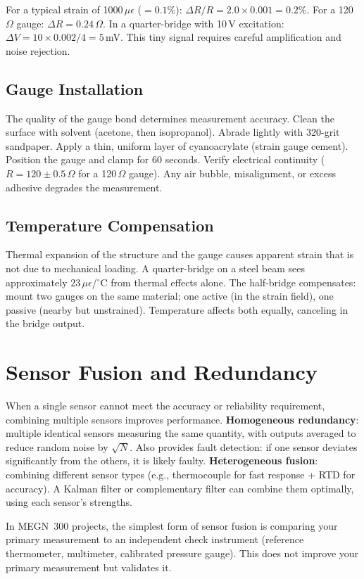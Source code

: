 \documentclass[11pt,letterpaper,twoside,openany]{book}
\newcommand{\degC}{\ensuremath{{}^{\circ}\text{C}}}
\begin{document}
For a typical strain of 1000\,$\mu\epsilon$ ($= 0.1\%$): $\Delta R/R = 2.0 \times 0.001 = 0.2\%$. For a 120\,$\Omega$ gauge: $\Delta R = 0.24\,\Omega$. In a quarter-bridge with 10\,V excitation: $\Delta V = 10 \times 0.002/4 = 5$\,mV. This tiny signal requires careful amplification and noise rejection.

\subsection{Gauge Installation}
The quality of the gauge bond determines measurement accuracy. Clean the surface with solvent (acetone, then isopropanol). Abrade lightly with 320-grit sandpaper. Apply a thin, uniform layer of cyanoacrylate (strain gauge cement). Position the gauge and clamp for 60 seconds. Verify electrical continuity ($R = 120 \pm 0.5\,\Omega$ for a 120\,$\Omega$ gauge). Any air bubble, misalignment, or excess adhesive degrades the measurement.

\subsection{Temperature Compensation}
Thermal expansion of the structure and the gauge causes apparent strain that is not due to mechanical loading. A quarter-bridge on a steel beam sees approximately $23\,\mu\epsilon$/\degC{} from thermal effects alone. The half-bridge compensates: mount two gauges on the same material; one active (in the strain field), one passive (nearby but unstrained). Temperature affects both equally, canceling in the bridge output.
\section{Sensor Fusion and Redundancy}
When a single sensor cannot meet the accuracy or reliability requirement, combining multiple sensors improves performance. \textbf{Homogeneous redundancy}: multiple identical sensors measuring the same quantity, with outputs averaged to reduce random noise by $\sqrt{N}$. Also provides fault detection: if one sensor deviates significantly from the others, it is likely faulty. \textbf{Heterogeneous fusion}: combining different sensor types (e.g., thermocouple for fast response + RTD for accuracy). A Kalman filter or complementary filter can combine them optimally, using each sensor's strengths.

In MEGN~300 projects, the simplest form of sensor fusion is comparing your primary measurement to an independent check instrument (reference thermometer, multimeter, calibrated pressure gauge). This does not improve your primary measurement but validates it.
\end{document}
